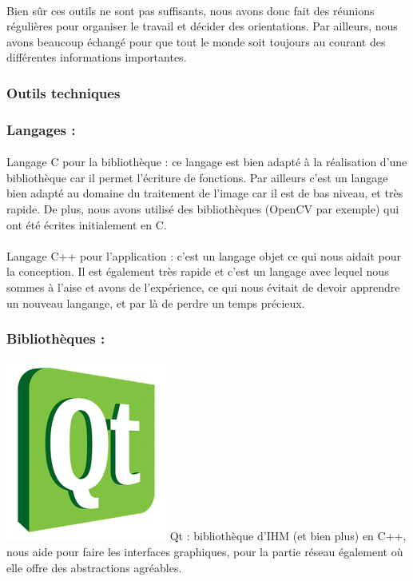 \documentclass{report}
\begin{document}
			\paragraph{} Bien sûr ces outils ne sont pas suffisants, nous avons donc fait des réunions régulières pour organiser le travail et décider des orientations. Par ailleurs, nous avons beaucoup échangé pour que tout le monde soit toujours au courant des différentes informations importantes.
			
			\subsubsection{Outils techniques}
			\subsubsection{Langages :}
			\paragraph{} Langage C pour la bibliothèque : ce langage est bien adapté à la réalisation d'une bibliothèque car il permet l'écriture de fonctions. Par ailleurs c'est un langage bien adapté au domaine du traitement de l'image car il est de bas niveau, et très rapide. De plus, nous avons utilisé des bibliothèques (OpenCV par exemple) qui ont été écrites initialement en C.
			\paragraph{} Langage C++ pour l'application : c'est un langage objet ce qui nous aidait pour la conception. Il est également très rapide et c'est un langage avec lequel nous sommes à l'aise et avons de l'expérience, ce qui nous évitait de devoir apprendre un nouveau langange, et par là de perdre un temps précieux.\\
			
			\subsubsection{Bibliothèques :}
			\includegraphics[scale=0.15]{../logos/qt_logo.png}
			Qt : bibliothèque d'IHM (et bien plus) en C++, nous aide pour faire les interfaces graphiques, pour la partie réseau également où elle offre des abstractions agréables. \\
\end{document}
